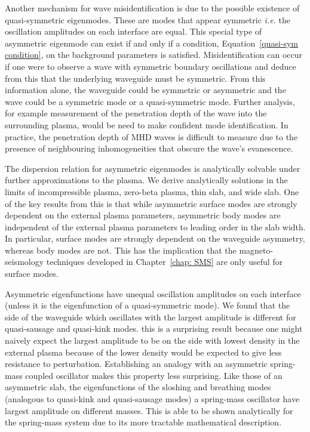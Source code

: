 \documentclass[12pt,draft]{../style-files/ociamthesis}
\begin{document}
Another mechanism for wave misidentification is due to the possible existence of quasi-symmetric eigenmodes. These are modes that appear symmetric \textit{i.e.} the oscillation amplitudes on each interface are equal. This special type of asymmetric eigenmode can exist if and only if a condition, Equation~\eqref{quasi-sym condition}, on the background parameters is satisfied. Misidentification can occur if one were to observe a wave with symmetric boundary oscillations and deduce from this that the underlying waveguide must be symmetric. From this information alone, the waveguide could be symmetric or asymmetric and the wave could be a symmetric mode or a quasi-symmetric mode. Further analysis, for example measurement of the penetration depth of the wave into the surrounding plasma, would be need to make confident mode identification. In practice, the penetration depth of MHD waves is difficult to measure due to the presence of neighbouring inhomogeneities that obscure the wave's evanescence.

The dispersion relation for asymmetric eigenmodes is analytically solvable under further approximations to the plasma. We derive analytically solutions in the limits of incompressible plasma, zero-beta plasma, thin slab, and wide slab. One of the key results from this is that while asymmetric surface modes are strongly dependent on the external plasma parameters, asymmetric body modes are independent of the external plasma parameters to leading order in the slab width. In particular, surface modes are strongly dependent on the waveguide asymmetry, whereas body modes are not. This has the implication that the magneto-seismology techniques developed in Chapter~\ref{chap: SMS} are only useful for surface modes.

Asymmetric eigenfunctions have unequal oscillation amplitudes on each interface (unless it is the eigenfunction of a quasi-symmetric mode). We found that the side of the waveguide which oscillates with the largest amplitude is different for quasi-sausage and quasi-kink modes. this is a surprising result because one might naively expect the largest amplitude to be on the side with lowest density in the external plasma because of the lower density would be expected to give less resistance to perturbation. Establishing an analogy with an asymmetric spring-mass coupled oscillator makes this property less surprising. Like those of an asymmetric slab, the eigenfunctions of the sloshing and breathing modes (analogous to quasi-kink and quasi-sausage modes) a spring-mass oscillator have largest amplitude on different masses. This is able to be shown analytically for the spring-mass system due to its more tractable mathematical description.
\end{document}
